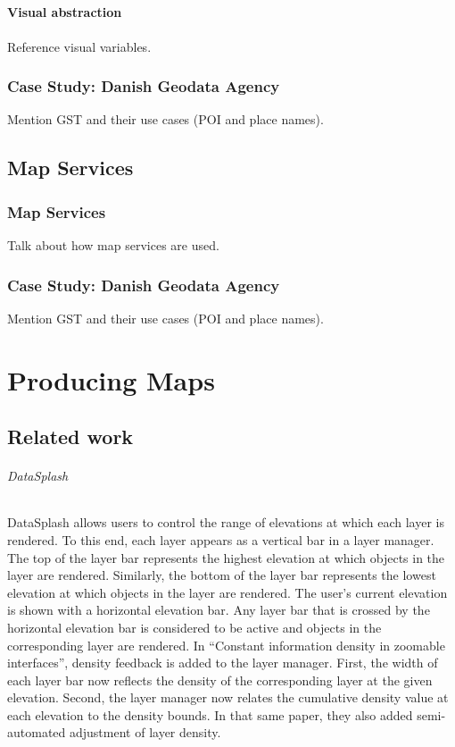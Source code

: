 \documentclass[11pt, oneside]{report}   	%
\begin{document}
\subsubsection{}

\subsection{Visual abstraction}
Reference visual variables.

\section{Case Study: Danish Geodata Agency}
Mention GST and their use cases (POI and place names).

\chapter{Map Services}

\section{Map Services}
Talk about how map services are used.

\section{Case Study: Danish Geodata Agency}
Mention GST and their use cases (POI and place names).


\part{Producing Maps}

\chapter{Related work}
\paragraph{DataSplash} DataSplash allows users to control the range of elevations at which each layer is rendered. To this end, each layer appears as a vertical bar in a layer manager. The top of the layer bar represents the highest elevation at which objects in the layer are rendered. Similarly, the bottom of the layer bar represents the lowest elevation at which objects in the layer are rendered. The user's current elevation is shown with a horizontal elevation bar. Any layer bar that is crossed by the horizontal elevation bar is considered to be active and objects in the corresponding layer are rendered. In ``Constant information density in zoomable interfaces'', density feedback is added to the layer manager. First, the width of each layer bar now reflects the density of the corresponding layer at the given elevation. Second, the layer manager now relates the cumulative density value at each elevation to the density bounds. In that same paper, they also added semi-automated adjustment of layer density.
\end{document}
